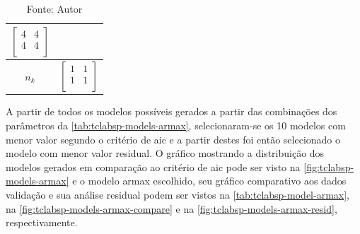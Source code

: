 \begin{table}[h]
\begin{tabular}{c|c}
							$ \begin{bmatrix}	4	&	4	\\	4	&	4	\\	\end{bmatrix} $		\\ \midrule
		$n_k$			&
							$ \begin{bmatrix}	1	&	1	\\	1	&	1	\\	\end{bmatrix} $		\\ \bottomrule
	\end{tabular}
	\caption*{Fonte: Autor}
\end{table}

A partir de todos os modelos possíveis gerados a partir das combinações dos parâmetros da \cref{tab:tclabsp-models-armax},
selecionaram-se os 10 modelos com menor valor segundo o critério de \acrshort{aic} e a partir destes foi então
selecionado o modelo com menor valor residual.
O gráfico mostrando a distribuição dos modelos gerados em comparação ao critério de \acrshort{aic} pode ser
visto na \cref{fig:tclabsp-models-armax} e o modelo \acrshort{armax} escolhido, seu gráfico comparativo aos dados validação
e sua análise residual podem ser vistos na \cref{tab:tclabsp-model-armax}, na \cref{fig:tclabsp-models-armax-compare} e na
\cref{fig:tclabsp-models-armax-resid}, respectivamente.

